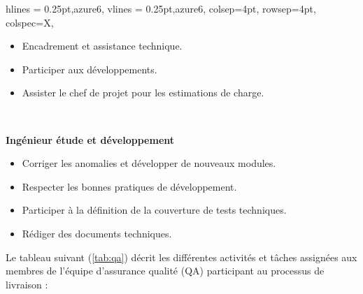 \begin{longtblr}[caption={Responsabilités et missions des différents acteurs de l'équipe de dév}, label={tab:dev}]{
    hlines = {0.25pt,azure6},
    vlines = {0.25pt,azure6},
    colsep=4pt,
    rowsep=4pt,
	colspec={X},
}
\begin{minipage}{\linewidth}
\begin{itemize}
        \item Encadrement et assistance technique.
        \item Participer aux développements.
        \item Assister le chef de projet pour les estimations de charge.\\
    \end{itemize}
\end{minipage}\\
\begin{minipage}{\linewidth}
    {
        \textbf{Ingénieur étude et développement}\\
    }
    \begin{itemize}
        \item Corriger les anomalies et développer de nouveaux modules.
        \item Respecter les bonnes pratiques de développement.
        \item Participer à la définition de la couverture de tests techniques.
        \item Rédiger des documents techniques.\\
    \end{itemize}
\end{minipage}
\end{longtblr}
Le tableau suivant (\ref{tab:qa}) décrit les différentes activités et tâches assignées aux membres de l'équipe d'assurance qualité (QA) participant au processus de livraison :
